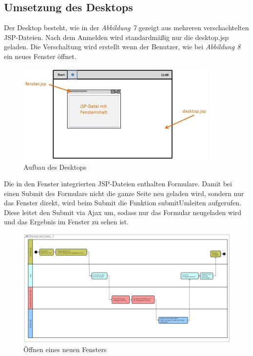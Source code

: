 \documentclass[12pt, a4paper]{article}
\begin{document}
\subsection{Umsetzung des Desktops}
Der Desktop besteht, wie in der \textit{Abbildung 7} gezeigt aus mehreren verschachtelten JSP-Dateien. Nach dem Anmelden wird standardmäßig nur die \glqq desktop.jsp\grqq{} geladen. Die Verschaltung wird erstellt wenn der Benutzer, wie bei \textit{Abbildung 8} ein neues Fenster öffnet.

\begin{figure}[H]
	\begin{center}
		\includegraphics[width=100mm]{Bilder/desktop.jpg}
	\end{center}
	\caption{Aufbau des Desktops}
\end{figure}

Die in den Fenster integrierten JSP-Dateien enthalten Formulare. Damit bei einen Submit des Formulars nicht die ganze Seite neu geladen wird, sondern nur das Fenster direkt, wird beim Submit die Funktion \glqq submitUmleiten\grqq{} aufgerufen. Diese leitet den Submit via Ajax um, sodass nur das Formular neugeladen wird und das Ergebnis im Fenster zu sehen ist.


\begin{figure}[H]
	\begin{center}
		\includegraphics[width=220mm,angle=90]{Bilder/fenster_oeffnen.png}
	\end{center}
	\caption{Öffnen eines neuen Fensters}
\end{figure}
\end{document}
